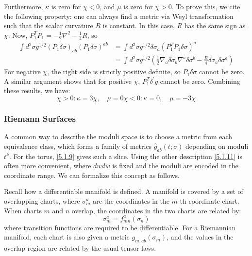 Furthermore, $\kappa$ is zero for $\chi < 0$, and $\mu$ is zero for $\chi > 0$. To prove this, we cite the following property: one can always find a metric via Weyl transformation such that the scalar curvature $R$ is constant. In this case, $R$ has the same sign as $\chi$. Now, $P_{1}^{T} P_{1}=-\frac{1}{2} \nabla^{2}-\frac{1}{4} R$, so
\begin{equation}
	\begin{aligned}
		\int d^{2} \sigma g^{1 / 2}\left(P_{1} \delta \sigma\right)_{a b}\left(P_{1} \delta \sigma\right)^{a b} &=\int d^{2} \sigma g^{1 / 2} \delta \sigma_{a}\left(P_{1}^{T} P_{1} \delta \sigma\right)^{a} \\
		&=\int d^{2} \sigma g^{1 / 2}\left(\frac{1}{2} \nabla_{a} \delta \sigma_{b} \nabla^{a} \delta \sigma^{b}-\frac{R}{4} \delta \sigma_{a} \delta \sigma^{a}\right)
	\end{aligned}\label{5.2.10}
\end{equation}
For negative $\chi$, the right side is strictly positive definite, so $P_{1} \delta \sigma$ cannot be zero. A similar argument shows that for positive $\chi$, $P_{1}^{T} \delta^{\prime} g$ cannot be zero. Combining these results, we have:
\begin{subequations}
	\begin{equation}
		\chi>0:  \kappa=3 \chi, \quad \mu=0 
	\end{equation}
	\begin{equation}
		\chi<0:  \kappa=0, \quad \mu=-3 \chi
	\end{equation}				\label{5.2.11}		
\end{subequations}

\subsubsection*{\Large Riemann Surfaces}
A common way to describe the moduli space is to choose a metric from each equivalence class, which forms a family of metrics $\hat{g}_{a b}(t ; \sigma)$ depending on moduli $t^{k}$. For the torus, \eqref{5.1.9} gives such a slice. Using the other description \eqref{5.1.11} is often more convenient, where $d w d \bar{w}$ is fixed and the moduli are encoded in the coordinate range. We can formalize this concept as follows.

Recall how a differentiable manifold is defined. A manifold is covered by a set of overlapping charts, where $\sigma_{m}^{a}$ are the coordinates in the $m$-th coordinate chart. When charts $m$ and $n$ overlap, the coordinates in the two charts are related by:
\begin{equation}
	\sigma_{m}^{a}=f_{m n}^{a}\left(\sigma_{n}\right) \label{5.2.12}		
\end{equation}
where transition functions are required to be differentiable. For a Riemannian manifold, each chart is also given a metric $g_{m, a b}\left(\sigma_{m}\right)$, and the values in the overlap region are related by the usual tensor laws.

